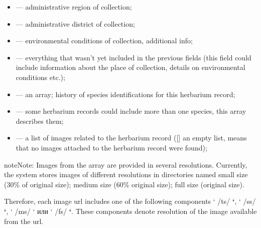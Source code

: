 \documentclass[letterpaper,10pt,english]{sphinxmanual}
\begin{document}
\begin{itemize}
\item {} 
 —  administrative region of collection;

\item {} 
 — administrative district of collection;

\item {} 
 — environmental conditions of collection, additional info;

\item {} 
 — everything that wasn’t yet included
in the previous fields (this field could include information about the place of collection,
details on environmental conditions etc.);

\item {} 
 — an array; history of species identifications for this herbarium record;

\item {} 
 — some herbarium records could include more than one species, this array describes them;

\item {} 
 — a list of images related to the herbarium record ({[}{]} \textendash{} an empty list, means that no images
attached to the herbarium record were found);

\end{itemize}

\begin{sphinxadmonition}{note}{Note:}
Images from the  array are provided in several resolutions.
Currently, the system stores images of different resolutions in directories
named  \textendash{} small size (30\% of original size);  \textendash{} medium size (60\% original size);
 \textendash{} full size (original size).
\end{sphinxadmonition}

Therefore, each image url includes one of the following components
{}` /ts/ {\color{red}\bfseries{}{}`}, {}` /ss/ {\color{red}\bfseries{}{}`}, {}` /ms/ {}` или {}` /fs/ {\color{red}\bfseries{}{}`}. These components denote resolution of the image
available from the url.
\end{document}
